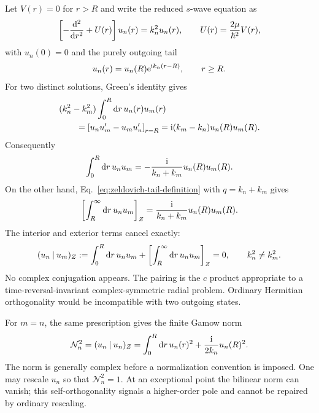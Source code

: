 Let $V(r)=0$ for $r>R$ and write the reduced $s$-wave equation as
\begin{equation}
  \left[-\frac{\mathrm{d}^2}{\mathrm{d} r^2}+U(r)\right]u_n(r)
  =k_n^2u_n(r),
  \qquad U(r)=\frac{2\mu}{\hbar^2}V(r),
  \label{eq:berggren-radial-equation}
\end{equation}
with $u_n(0)=0$ and the purely outgoing tail
\begin{equation}
  u_n(r)=u_n(R)\mathrm{e}^{\mathrm{i} k_n(r-R)},
  \qquad r\geq R .
  \label{eq:berggren-outgoing-tail}
\end{equation}
For two distinct solutions, Green's identity gives
\begin{align}
  &(k_n^2-k_m^2)\int_0^R\mathrm{d} r\,u_n(r)u_m(r)
  \notag\\
  &\qquad=
  \left[u_nu_m'-u_mu_n'\right]_{r=R}
  =\mathrm{i}(k_m-k_n)u_n(R)u_m(R) .
  \label{eq:berggren-green-identity}
\end{align}
Consequently
\begin{equation}
  \int_0^R\mathrm{d} r\,u_nu_m
  =-\frac{\mathrm{i}}{k_n+k_m}u_n(R)u_m(R) .
  \label{eq:berggren-interior-overlap}
\end{equation}
On the other hand, Eq.~\eqref{eq:zeldovich-tail-definition} with
$q=k_n+k_m$ gives
\begin{equation}
  \left[\int_R^\infty\mathrm{d} r\,u_nu_m\right]_{Z}
  =\frac{\mathrm{i}}{k_n+k_m}u_n(R)u_m(R) .
  \label{eq:berggren-tail-overlap}
\end{equation}
The interior and exterior terms cancel exactly:
\begin{equation}
  (u_n\mathbin{|}u_m)_Z
  :=\int_0^R\mathrm{d} r\,u_nu_m
  +\left[\int_R^\infty\mathrm{d} r\,u_nu_m\right]_{Z}
  =0,
  \qquad k_n^2\ne k_m^2 .
  \label{eq:berggren-orthogonality}
\end{equation}
No complex conjugation appears.  The pairing is the $c$ product appropriate
to a time-reversal-invariant complex-symmetric radial problem.  Ordinary
Hermitian orthogonality would be incompatible with two outgoing states.

For $m=n$, the same prescription gives the finite Gamow norm
\begin{equation}
  \mathcal N_n^2
  =(u_n\mathbin{|}u_n)_Z
  =\int_0^R\mathrm{d} r\,u_n(r)^2
  +\frac{\mathrm{i}}{2k_n}u_n(R)^2 .
  \label{eq:berggren-s-wave-norm}
\end{equation}
The norm is generally complex before a normalization convention is imposed.
One may rescale $u_n$ so that $\mathcal N_n^2=1$.  At an exceptional point
the bilinear norm can vanish; this self-orthogonality signals a higher-order
pole and cannot be repaired by ordinary rescaling.

